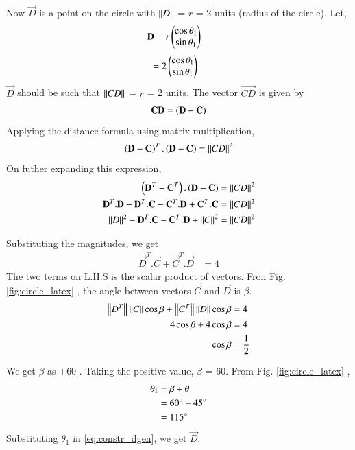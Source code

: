\begin{enumerate}[label=\thesection.\arabic*.,ref=\thesection.\theenumi]
Now $\vec{D}$ is a point on the circle with $\left\lVert D\right\rVert$ = $r$ = 2 units (radius of the circle).
Let,
\begin{align}
\mathbf{D} & = r\begin{pmatrix}\cos\theta_1\\\sin\theta_1\end{pmatrix} 
\end{align}
\begin{align}
  & = 2\begin{pmatrix}\cos\theta_1\\\sin\theta_1\end{pmatrix}
\label{eq:constr_dgen}
\end{align}
$\vec{D}$ should be such that $\left\lVert CD\right\rVert$ = $r$ = 2 units. The vector $\vec{CD}$ is given by 
\begin{align}
\mathbf{CD} = \left(\mathbf{D} - \mathbf{C}\right)
\end{align}
Applying the distance formula using matrix multiplication,
\begin{align}
\left(\mathbf{D} - \mathbf{C}\right)^T.\left(\mathbf{D} - \mathbf{C}\right) &= \left\lVert CD\right\rVert ^2\\
 \label{eq:dist_formula}
\end{align}
On futher expanding this expression,
\begin{align}
 \left(\mathbf{D}^T - \mathbf{C}^T\right).\left(\mathbf{D} - \mathbf{C}\right) &= \left\lVert CD\right\rVert ^2 \\
 \mathbf{D}^T.\mathbf{D} - \mathbf{D}^T.\mathbf{C} - \mathbf{C}^T.\mathbf{D} + \mathbf{C}^T.\mathbf{C} &= \left\lVert CD\right\rVert^2 \\
 \left\lVert D\right\rVert ^2 - \mathbf{D}^T.\mathbf{C} - \mathbf{C}^T.\mathbf{D} + \left\lVert C\right\rVert^2 &= \left\lVert CD\right\rVert^2 
\end{align}

Substituting the magnitudes, we get
\begin{align}
\vec{D}^T.\vec{C} + \vec{C}^T.\vec{D} &= 4
\end{align}
The two terms on L.H.S is the scalar product of vectors. Fron Fig. \ref{fig:circle_latex} , the angle between vectors $\vec{C}$ and $\vec{D}$ is $\beta$.
\begin{align}
\left\lVert D^T\right\rVert\left\lVert C\right\rVert\cos\beta + \left\lVert C^T\right\rVert\left\lVert D\right\rVert\cos\beta &= 4 \\
4\cos\beta + 4\cos\beta &= 4 \\
\cos\beta &= \frac{1}{2}
\end{align}

We get $\beta$ as $\pm$60 \degree. Taking the positive value, $\beta$ = 60\degree. From Fig. \ref{fig:circle_latex} , 
\begin{align}
\theta_1 &= \beta + \theta  \\
 &= 60\degree + 45\degree \\
 &= 115\degree
\end{align}
Substituting $\theta_1$ in \eqref{eq:constr_dgen}, we get $\vec{D}$. 




\end{enumerate}
